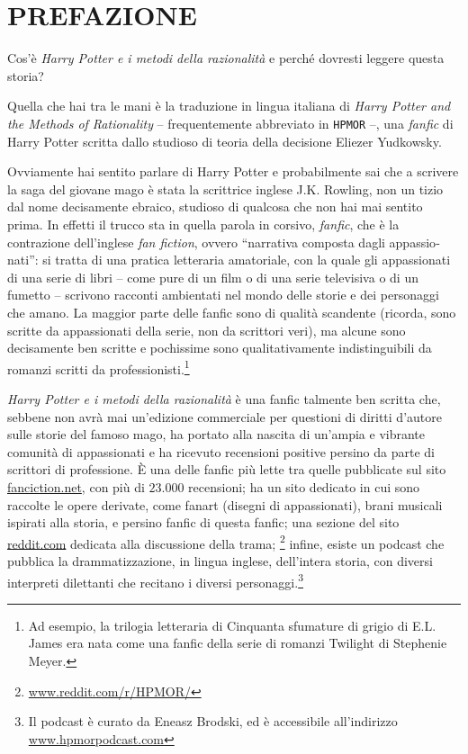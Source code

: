 
\chapter*{PREFAZIONE}

Cos’è \emph{Harry Potter e i metodi della razionalità} e perché dovresti leggere questa storia?

Quella che hai tra le mani è la traduzione in lingua italiana di \emph{Harry Potter and the Methods of Rationality} -- frequentemente abbreviato in \texttt{HPMOR} --, una \emph{fanfic} di Harry Potter scritta dallo studioso di teoria della decisione Eliezer Yudkowsky.

Ovviamente hai sentito parlare di Harry Potter e probabilmente sai che a scrivere la saga del giovane mago è stata la scrittrice inglese J.K. Rowling, non un tizio dal nome decisamente ebraico, studioso di qualcosa che non hai mai sentito prima. In effetti il trucco sta in quella parola in corsivo, \emph{fanfic}, che è la contrazione dell’inglese \emph{fan fiction}, ovvero \foreignquote{german}{narrativa composta dagli appassionati}: si tratta di una pratica letteraria amatoriale, con la quale gli appassionati di una serie di libri -- come pure di un film o di una serie televisiva o di un fumetto -- scrivono racconti ambientati nel mondo delle storie e dei personaggi che amano. La maggior parte delle fanfic sono di qualità scandente (ricorda, sono scritte da appassionati della serie, non da scrittori veri), ma alcune sono decisamente ben scritte e pochissime sono qualitativamente indistinguibili da romanzi scritti da professionisti.\footnote{Ad esempio, la trilogia letteraria di Cinquanta sfumature di grigio di E.L. James era nata come una fanfic della serie di romanzi Twilight di Stephenie Meyer.}

\emph{Harry Potter e i metodi della razionalità} è una fanfic talmente ben scritta che, sebbene non avrà mai un’edizione commerciale per questioni di diritti d’autore sulle storie del famoso mago, ha portato alla nascita di un’ampia e vibrante comunità di appassionati e ha ricevuto recensioni positive persino da parte di scrittori di professione. È una delle fanfic più lette tra quelle pubblicate sul sito \href{fanfiction.net}{fanciction.net}, con più di $23.000$ recensioni; ha un sito dedicato in cui sono raccolte le opere derivate, come fanart (disegni di appassionati), brani musicali ispirati alla storia, e persino fanfic di questa fanfic; una sezione del sito \href{https://reddit.com}{reddit.com} dedicata alla discussione della trama; \footnote{\href{https://www.reddit.com/r/HPMOR/}{www.reddit.com/r/HPMOR/}} infine, esiste un podcast che pubblica la drammatizzazione, in lingua inglese, dell’intera storia, con diversi interpreti dilettanti che recitano i diversi personaggi.\footnote{Il podcast è curato da Eneasz Brodski, ed è accessibile all’indirizzo \href{https://www.hpmorpodcast.com}{www.hpmorpodcast.com}}

